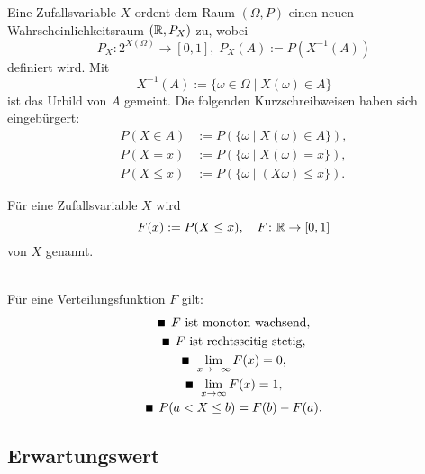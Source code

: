 \noindent
Eine Zufallsvariable $X$ ordent dem Raum $(\Omega,P)$
einen neuen Wahrscheinlichkeitsraum $(\mathbb R,P_X)$ zu, wobei%
\begin{equation}
P_X\colon 2^{X(\Omega)}\to [0,1],\; P_X(A):=P(X^{-1}(A))
\end{equation}
definiert wird. Mit
\begin{equation}
X^{-1}(A) := \{\omega\in\Omega\mid X(\omega)\in A\}
\end{equation}
ist das Urbild von $A$ gemeint.
Die folgenden Kurzschreibweisen haben sich
eingebürgert:
\begin{align}
P(X\in A) &:= P(\{\omega\mid X(\omega)\in A\}),\\
P(X=x) &:= P(\{\omega\mid X(\omega)=x\}),\\
P(X\le x) &:= P(\{\omega\mid (X\omega)\le x\}).
\end{align}

\begin{definition}[Verteilungsfunktion]\mbox{}\newline
Für eine Zufallsvariable $X$ wird
\begin{equation}
F(x):=P(X\le x),\quad F\colon\mathbb R\to [0,1]
\end{equation}
 von $X$ genannt.
\end{definition}

\noindent
{}\\
Für eine Verteilungsfunktion $F$ gilt:
\begin{gather}
\text{\scriptsize $\blacksquare$}\;\, F\text{ ist monoton wachsend},\\
\text{\scriptsize $\blacksquare$}\;\, F\text{ ist rechtsseitig stetig},\\
\text{\scriptsize $\blacksquare$}\;\, \lim\limits_{x\to -\infty} F(x) = 0,\\
\text{\scriptsize $\blacksquare$}\;\, \lim\limits_{x\to\infty} F(x)=1,\\
\text{\scriptsize $\blacksquare$}\;\, P(a<X\le b) = F(b)-F(a).
\end{gather}

\subsection{Erwartungswert}

